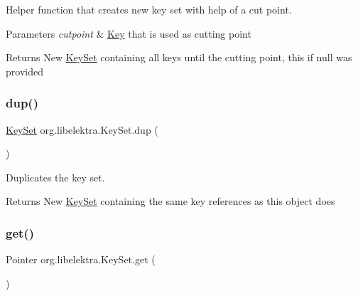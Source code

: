 Helper function that creates new key set with help of a cut point. 


\begin{DoxyParams}{Parameters}
{\em cutpoint} & \mbox{\hyperlink{classorg_1_1libelektra_1_1Key}{Key}} that is used as cutting point \\
\hline
\end{DoxyParams}
\begin{DoxyReturn}{Returns}
New \mbox{\hyperlink{classorg_1_1libelektra_1_1KeySet}{Key\+Set}} containing all keys until the cutting point, this if null was provided 
\end{DoxyReturn}
\mbox{\label{classorg_1_1libelektra_1_1KeySet_af3571c68cd55983c45666cf9f75143a1}} 
\subsubsection{\texorpdfstring{dup()}{dup()}}
{\footnotesize\ttfamily \mbox{\hyperlink{classorg_1_1libelektra_1_1KeySet}{Key\+Set}} org.\+libelektra.\+Key\+Set.\+dup (\begin{DoxyParamCaption}{ }\end{DoxyParamCaption})\hspace{0.3cm}{\ttfamily [inline]}}



Duplicates the key set. 

\begin{DoxyReturn}{Returns}
New \mbox{\hyperlink{classorg_1_1libelektra_1_1KeySet}{Key\+Set}} containing the same key references as this object does 
\end{DoxyReturn}
\mbox{\label{classorg_1_1libelektra_1_1KeySet_abf3f028c9c3b88a47aa9d67a5c8e95da}} 
\subsubsection{\texorpdfstring{get()}{get()}}
{\footnotesize\ttfamily Pointer org.\+libelektra.\+Key\+Set.\+get (\begin{DoxyParamCaption}{ }\end{DoxyParamCaption})\hspace{0.3cm}{\ttfamily [inline]}}



